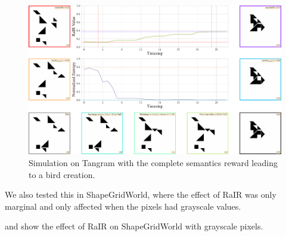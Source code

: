 \begin{figure}[H]
    \centering
    \includegraphics[width=\textwidth]{images/sim_rair_later_bird.pdf}
    \caption{Simulation on Tangram with the complete semantics reward leading to a bird creation.}
    \label{fig:sim}
\end{figure}

We also tested this in ShapeGridWorld, where the effect of RaIR was only marginal and only affected when the pixels had grayscale values.

 and  show the effect of RaIR on ShapeGridWorld with grayscale pixels.


